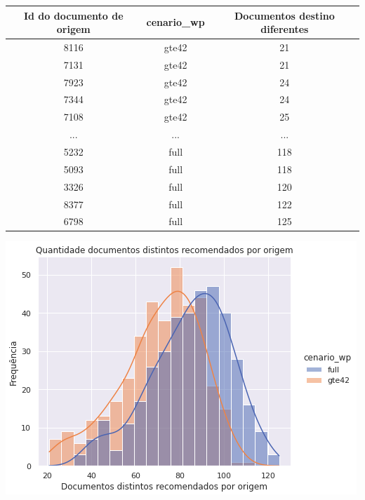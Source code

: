 \begin{center}
    \begin{tabular}{|c|c|c|}
        \hline
        Id do documento de origem & cenario\_wp & Documentos destino diferentes \\
        \hline
        8116 & gte42 & 21 \\
        \hline
        7131 & gte42 & 21 \\
        \hline
        7923 & gte42 & 24 \\
        \hline
        7344 & gte42 & 24 \\
        \hline
        7108 & gte42 & 25 \\
        \hline
        ... & ... & ... \\
        \hline
        5232 & full & 118 \\
        \hline
        5093 & full & 118 \\
        \hline
        3326 & full & 120 \\
        \hline
        8377 & full & 122 \\
        \hline
        6798 & full & 125 \\
        \hline
    \end{tabular}
\end{center}

\includegraphics[scale=0.7]{resultados/resources/distribuicao_semelhantes_distintos_cenario_wp.png}

